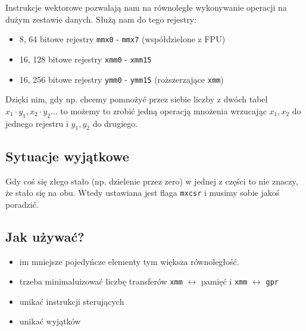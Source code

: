 Instrukcje wektorowe pozwalają nam na równoległe wykonywanie operacji na dużym zestawie danych. Służą nam do tego rejestry:
\begin{itemize}
    \item 8, 64 bitowe rejestry \texttt{mmx0} - \texttt{mmx7} (współdzielone z FPU)
    \item 16, 128 bitowe rejestry \texttt{xmm0} - \texttt{xmm15}
    \item 16, 256 bitowe rejestry \texttt{ymm0} - \texttt{ymm15} (roższerzające \texttt{xmm})
\end{itemize}

Dzięki nim, gdy np. chcemy pomnożyć przez siebie liczby z dwóch tabel $x_1 \cdot y_1, x_2 \cdot y_2 \ldots$ to możemy to zrobić jedną operacją mnożenia wrzucając $x_1, x_2$ do jednego rejestru i $y_1, y_2$ do drugiego.

\subsection{Sytuacje wyjątkowe}

Gdy coś się złego stało (np. dzielenie przez zero) w jednej z części to nie znaczy, że stało się na obu. Wtedy ustawiana jest flaga \texttt{mxcsr} i musimy sobie jakoś poradzić.

\subsection{Jak używać?}

\begin{itemize}
    \item im mniejsze pojedyńcze elementy tym większa równoległość.
    \item trzeba minimaluizować liczbę transferów \texttt{xmm} $\leftrightarrow$ pamięć i \texttt{xmm} $\leftrightarrow$ \texttt{gpr}
    \item unikać instrukcji sterujących
    \item unikać wyjątków
\end{itemize}
